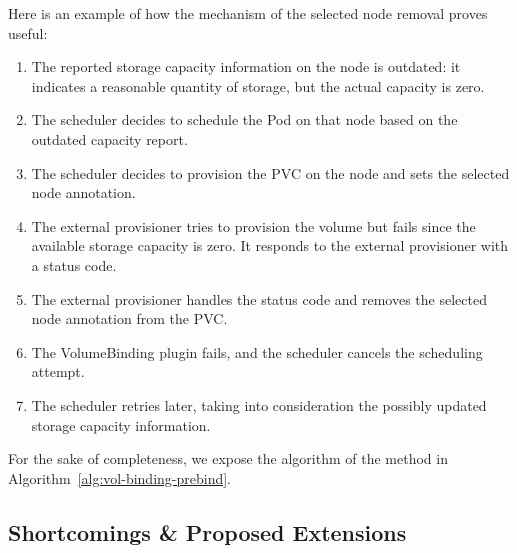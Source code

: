Here is an example of how the mechanism of the selected node  removal proves
useful:
\begin{enumerate}
      \tightlist
      \item The reported storage capacity information on the node is outdated:
            it indicates a reasonable quantity of storage, but the actual
            capacity is zero.
      \item The scheduler decides to schedule the Pod on that node based on the
            outdated capacity report.
      \item The scheduler decides to provision the PVC on the node and sets the
            selected node annotation.
      \item The external provisioner tries to provision the volume but fails
            since the available storage capacity is zero. It responds to the
            external provisioner with a  status code.
      \item The external provisioner handles the  status
            code and removes the selected node annotation from the PVC.
      \item The VolumeBinding plugin fails, and the scheduler cancels the
            scheduling attempt.
      \item The scheduler retries later, taking into consideration the possibly
            updated storage capacity information.
\end{enumerate}


For the sake of completeness, we expose the algorithm of the 
method in Algorithm~\ref{alg:vol-binding-prebind}.

\subsection{Shortcomings \& Proposed Extensions}

